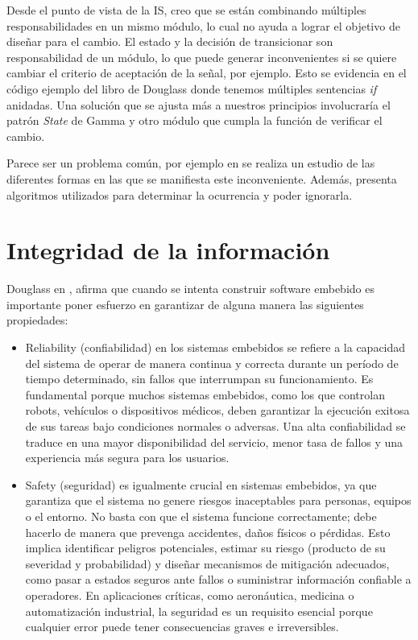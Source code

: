 Desde el punto de vista de la IS, creo que se están combinando múltiples responsabilidades en un mismo módulo, lo cual no ayuda a lograr el objetivo de diseñar para el cambio. El estado y la decisión de transicionar son responsabilidad de un módulo, lo que puede generar inconvenientes si se quiere cambiar el criterio de aceptación de la señal, por ejemplo. Esto se evidencia en el código ejemplo del libro de Douglass donde tenemos múltiples sentencias \textit{if} anidadas. Una solución que se ajusta más a nuestros principios involucraría el patrón \textit{State} de Gamma y otro módulo que cumpla la función de verificar el cambio.

Parece ser un problema común, por ejemplo en \cite{ganssleDebouncing} se realiza un estudio de las diferentes formas en las que se manifiesta este inconveniente. Además, presenta algoritmos utilizados para determinar la ocurrencia y poder ignorarla.


\section{Integridad de la información}

Douglass en \cite{douglass}, afirma que cuando se intenta construir software embebido es importante poner esfuerzo en garantizar de alguna manera las siguientes propiedades:

\begin{itemize}
\item Reliability (confiabilidad) en los sistemas embebidos se refiere a la capacidad del sistema de operar de manera continua y correcta durante un período de tiempo determinado, sin fallos que interrumpan su funcionamiento. Es fundamental porque muchos sistemas embebidos, como los que controlan robots, vehículos o dispositivos médicos, deben garantizar la ejecución exitosa de sus tareas bajo condiciones normales o adversas. Una alta confiabilidad se traduce en una mayor disponibilidad del servicio, menor tasa de fallos y una experiencia más segura para los usuarios.

\item Safety (seguridad) es igualmente crucial en sistemas embebidos, ya que garantiza que el sistema no genere riesgos inaceptables para personas, equipos o el entorno. No basta con que el sistema funcione correctamente; debe hacerlo de manera que prevenga accidentes, daños físicos o pérdidas. Esto implica identificar peligros potenciales, estimar su riesgo (producto de su severidad y probabilidad) y diseñar mecanismos de mitigación adecuados, como pasar a estados seguros ante fallos o suministrar información confiable a operadores. En aplicaciones críticas, como aeronáutica, medicina o automatización industrial, la seguridad es un requisito esencial porque cualquier error puede tener consecuencias graves e irreversibles.
\end{itemize}

